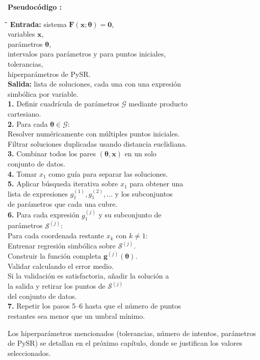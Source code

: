 \documentclass{article} \usepackage[utf8]{inputenc} \usepackage[spanish]{babel} \spanishdecimal{.} \usepackage{amsmath, amssymb, amsthm} \usepackage{bm} \usepackage{float} \usepackage{longtable} \usepackage[hidelinks]{hyperref}
\newcommand{\xvec}{\mathbf{x}} \newcommand{\thetavec}{\boldsymbol{\theta}} \newcommand{\Fvec}{\mathbf{F}} \newcommand{\R}{\mathbb{R}} \newcommand{\norm}[1]{\left\lVert#1\right\rVert} \newcommand{\loss}{\mathcal{L}} \newcommand{\dataset}{\mathcal{D}} \newcommand{\jac}{\mathbf{J}}
\begin{document}
\medskip {}\label{alg:proceso_principal} \noindent\textbf{Pseudocódigo \thepseudocode:} \begin{tabbing} \qquad \= \qquad \= \qquad \= \kill
\textbf{Entrada:} \>\>\> sistema \(\Fvec(\xvec; \thetavec) = \mathbf{0}\), \\
\>\>\> variables \(\xvec\), \\
\>\>\> parámetros \(\thetavec\), \\
\>\>\> intervalos para parámetros y para puntos iniciales, \\
\>\>\> tolerancias, \\
\>\>\> hiperparámetros de PySR. \\
\textbf{Salida:} \>\>\> lista de soluciones, cada una con una expresión \\
\>\>\> simbólica por variable. \\[4pt]
\textbf{1.} \> Definir cuadrícula de parámetros \(\mathcal{G}\) mediante producto \\
\> cartesiano. \\
\textbf{2.} \> Para cada \(\thetavec \in \mathcal{G}\): \\
\> \qquad Resolver numéricamente con múltiples puntos iniciales. \\
\> \qquad Filtrar soluciones duplicadas usando distancia euclidiana. \\
\textbf{3.} \> Combinar todos los pares \((\thetavec, \xvec)\) en un solo \\
\> conjunto de datos. \\
\textbf{4.} \> Tomar \(x_1\) como guía para separar las soluciones. \\
\textbf{5.} \> Aplicar búsqueda iterativa sobre \(x_1\) para obtener una \\
\> lista de expresiones \(g_1^{(1)}, g_1^{(2)}, \dots\) y los subconjuntos \\
\> de parámetros que cada una cubre. \\
\textbf{6.} \> Para cada expresión \(g_1^{(j)}\) y su subconjunto de \\
\> parámetros \(\mathcal{S}^{(j)}\): \\
\> \qquad Para cada coordenada restante \(x_k\) con \(k \neq 1\): \\
\> \qquad \qquad Entrenar regresión simbólica sobre \(\mathcal{S}^{(j)}\). \\
\> \qquad Construir la función completa \(\mathbf{g}^{(j)}(\thetavec)\). \\
\> \qquad Validar calculando el error medio. \\
\> \qquad Si la validación es satisfactoria, añadir la solución a \\
\> \qquad la salida y retirar los puntos de \(\mathcal{S}^{(j)}\) \\
\> \qquad del conjunto de datos. \\
\textbf{7.} \> Repetir los pasos 5--6 hasta que el número de puntos \\
\> restantes sea menor que un umbral mínimo. \end{tabbing} \medskip

Los hiperparámetros mencionados (tolerancias, número de intentos, parámetros de PySR) se detallan en el próximo capítulo, donde se justifican los valores seleccionados. \newpage   
\end{document}
